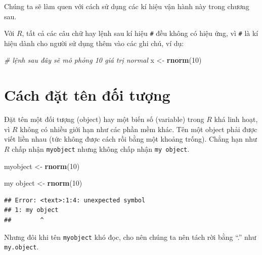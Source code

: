 \documentclass[
]{book}
\newenvironment{Shaded}{\begin{snugshade}}{\end{snugshade}}
\newcommand{\CommentTok}[1]{\textcolor[rgb]{0.56,0.35,0.01}{\textit{#1}}}
\newcommand{\DecValTok}[1]{\textcolor[rgb]{0.00,0.00,0.81}{#1}}
\newcommand{\KeywordTok}[1]{\textcolor[rgb]{0.13,0.29,0.53}{\textbf{#1}}}
\newcommand{\NormalTok}[1]{#1}
\newcommand{\StringTok}[1]{\textcolor[rgb]{0.31,0.60,0.02}{#1}}
\begin{document}
Chúng ta sẽ làm quen với cách sử dụng các kí hiệu vận hành này trong chương sau.

Với \(R\), tất cả các câu chữ hay lệnh sau kí hiệu \texttt{\#} đều không có hiệu ứng, vì \texttt{\#} là kí hiệu dành cho người sử dụng thêm vào các ghi chú, ví dụ:

\begin{Shaded}
\begin{Highlighting}[]
\CommentTok{\# lệnh sau đây sẽ mô phỏng 10 giá trị normal}
\NormalTok{x \textless{}{-}}\StringTok{ }\KeywordTok{rnorm}\NormalTok{(}\DecValTok{10}\NormalTok{) }
\end{Highlighting}
\end{Shaded}

\hypertarget{cuxe1ch-ux111ux1eb7t-tuxean-ux111ux1ed1i-tux1b0ux1ee3ng}{%
\section{Cách đặt tên đối tượng}\label{cuxe1ch-ux111ux1eb7t-tuxean-ux111ux1ed1i-tux1b0ux1ee3ng}}

Đặt tên một đối tượng (object) hay một biến số (variable) trong \(R\) khá linh hoạt, vì \(R\) không có nhiều giới hạn như các phần mềm khác. Tên một object phải được viết liền nhau (tức không được cách rồi bằng một khoảng trống). Chẳng hạn như \(R\) chấp nhận \texttt{myobject} nhưng không chấp nhận \texttt{my\ object}.

\begin{Shaded}
\begin{Highlighting}[]
\NormalTok{myobject \textless{}{-}}\StringTok{ }\KeywordTok{rnorm}\NormalTok{(}\DecValTok{10}\NormalTok{)}
\end{Highlighting}
\end{Shaded}

\begin{Shaded}
\begin{Highlighting}[]
\NormalTok{my object \textless{}{-}}\StringTok{ }\KeywordTok{rnorm}\NormalTok{(}\DecValTok{10}\NormalTok{)}
\end{Highlighting}
\end{Shaded}

\begin{verbatim}
## Error: <text>:1:4: unexpected symbol
## 1: my object
##        ^
\end{verbatim}

Nhưng đôi khi tên \texttt{myobject} khó đọc, cho nên chúng ta nên tách rời bằng ``.'' như \texttt{my.object}.
\end{document}
